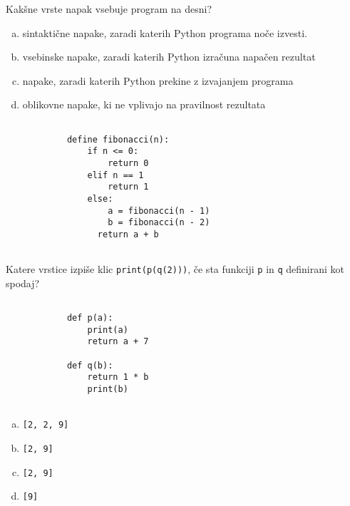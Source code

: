 \documentclass[arhiv, 10pt]{../izpit}
\newcommand{\inlinepy}[1]{\texttt{#1}}
\begin{document}
        \naloga*
        \begin{multicols}{2}
        \noindent
        Kakšne vrste napak vsebuje program na desni?

        \begin{enumerate}[(a)]
\item sintaktične napake, zaradi katerih Python programa noče izvesti.
\item vsebinske napake, zaradi katerih Python izračuna napačen rezultat
\item napake, zaradi katerih Python prekine z izvajanjem programa
\item oblikovne napake, ki ne vplivajo na pravilnost rezultata
\end{enumerate}

        \columnbreak

        \begin{verbatim}
        
            define fibonacci(n):
                if n <= 0:
                    return 0
                elif n == 1
                    return 1
                else:
                    a = fibonacci(n - 1)
                    b = fibonacci(n - 2)
                  return a + b
            
        \end{verbatim}

        \end{multicols}

    
        \naloga*
        Katere vrstice izpiše klic \inlinepy{print(p(q(2)))}, če sta funkciji \inlinepy{p} in \inlinepy{q} definirani kot spodaj?

        \begin{multicols}{2}
        \begin{verbatim}
        
            def p(a):
                print(a)
                return a + 7

            def q(b):
                return 1 * b
                print(b)
        
        \end{verbatim}

        \begin{enumerate}[(a)]
\item \inlinepy{[2, 2, 9]}
\item \inlinepy{[2, 9]}
\item \inlinepy{[2, 9]}
\item \inlinepy{[9]}
\end{enumerate}

        \end{multicols}
    
\end{document}
